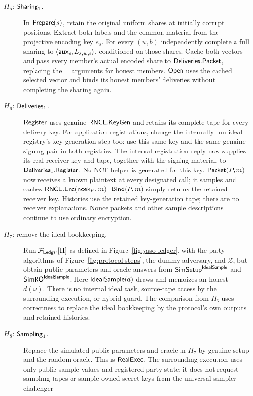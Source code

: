 \begin{description}
\item[$H_5$: $\mathsf{Sharing}_1$.]
 In $\mathsf{Prepare}(s)$, retain the original uniform shares at initially
 corrupt positions.  Extract both labels and the common material from
 the projective encoding key $e_s$.  For every $(w,b)$ independently
 complete a full sharing to
 $\langle\mathsf{aux}_s,L_{s,w,b}\rangle$, conditioned on those shares.
 Cache both vectors and pass every member's actual encoded share to
 $\mathsf{Deliveries}.\mathsf{Packet}$, replacing the $\bot$ arguments for honest
 members.  $\mathsf{Open}$ uses the cached selected vector and binds its honest
 members' deliveries without completing the sharing again.

\item[$H_6$: $\mathsf{Deliveries}_1$.]
 $\mathsf{Register}$ uses genuine $\mathsf{RNCE}.\mathsf{KeyGen}$ and retains its complete tape
 for every delivery key.  For application registrations, change the
 internally run ideal registry's key-generation step too: use this
 same key and the same genuine signing pair in both registries.
 The internal registration reply now supplies its real receiver key
 and tape, together with the signing material, to $\mathsf{Deliveries}_1.\mathsf{Register}$.
 No NCE helper is generated for this key.
 $\mathsf{Packet}(P,m)$ now receives a known plaintext at every designated call;
 it samples and caches $\mathsf{RNCE}.\mathsf{Enc}(\mathsf{ncek}_P,m)$.
 $\mathsf{Bind}(P,m)$ simply returns the retained receiver key.
 Histories use the retained key-generation tape; there are no receiver
 explanations.  Nonce packets and other sample descriptions continue
 to use ordinary encryption.

\item[$H_7$: remove the ideal bookkeeping.]
 Run $\mathcal F_{\mathsf{Ledger}}[\Pi]$ as defined in Figure~\ref{fig:yaso-ledger},
 with the party algorithms of Figure~\ref{fig:protocol-steps}, the dummy
 adversary, and $\mathcal Z$, but obtain public parameters and oracle answers from
 $\mathsf{SimSetup}^{\mathsf{IdealSample}}$ and $\mathsf{SimRO}^{\mathsf{IdealSample}}$.
 Here $\mathsf{IdealSample}(d)$ draws and memoizes an honest $d(\omega)$.
 There is no internal ideal task, source-tape access by the surrounding
 execution, or hybrid guard.  The comparison from $H_6$ uses correctness
 to replace the ideal bookkeeping by the protocol's own outputs and
 retained histories.

\item[$H_8$: $\mathsf{Sampling}_1$.]
 Replace the simulated public parameters and oracle in $H_7$ by genuine
 setup and the random oracle.  This is $\mathsf{RealExec}$.
 The surrounding execution uses only public sample values and registered
 party state; it does not request sampling tapes or sample-owned secret
 keys from the universal-sampler challenger.
\end{description}

